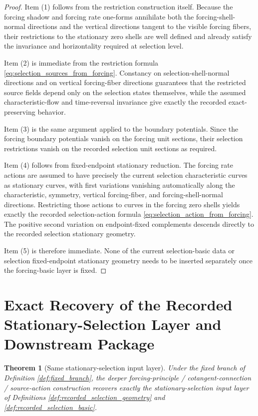 \documentclass[11pt]{article}
\newtheorem{theorem}{Theorem}
\begin{document}
\begin{proof}
Item (1) follows from the restriction construction itself. Because the forcing shadow and forcing rate one-forms annihilate both the forcing-shell-normal directions and the vertical directions tangent to the visible forcing fibers, their restrictions to the stationary zero shells are well defined and already satisfy the invariance and horizontality required at selection level.

Item (2) is immediate from the restriction formula \eqref{eq:selection_sources_from_forcing}. Constancy on selection-shell-normal directions and on vertical forcing-fiber directions guarantees that the restricted source fields depend only on the selection states themselves, while the assumed characteristic-flow and time-reversal invariance give exactly the recorded exact-preserving behavior.

Item (3) is the same argument applied to the boundary potentials. Since the forcing boundary potentials vanish on the forcing unit sections, their selection restrictions vanish on the recorded selection unit sections as required.

Item (4) follows from fixed-endpoint stationary reduction. The forcing rate actions are assumed to have precisely the current selection characteristic curves as stationary curves, with first variations vanishing automatically along the characteristic, symmetry, vertical forcing-fiber, and forcing-shell-normal directions. Restricting those actions to curves in the forcing zero shells yields exactly the recorded selection-action formula \eqref{eq:selection_action_from_forcing}. The positive second variation on endpoint-fixed complements descends directly to the recorded selection stationary geometry.

Item (5) is therefore immediate. None of the current selection-basic data or selection fixed-endpoint stationary geometry needs to be inserted separately once the forcing-basic layer is fixed.
\end{proof}

\section{Exact Recovery of the Recorded Stationary-Selection Layer and Downstream Package}

\begin{theorem}[Same stationary-selection input layer]
\label{thm:same_selection_input}
Under the fixed branch of Definition \ref{def:fixed_branch}, the deeper forcing-principle / cotangent-connection / source-action construction recovers exactly the stationary-selection input layer of Definitions \ref{def:recorded_selection_geometry} and \ref{def:recorded_selection_basic}.
\end{theorem}
\end{document}

